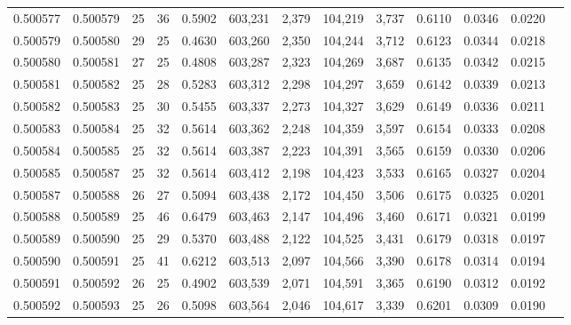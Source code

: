 \begin{tabular}{rrrrrrrrrrrrr}
0.500577 & 0.500579 &    25 &  36 &                                     0.5902 & 603,231 &   2,379 & 104,219 &   3,737 & 0.6110 & 0.0346 & 0.0220 \\
0.500579 & 0.500580 &    29 &  25 &                                     0.4630 & 603,260 &   2,350 & 104,244 &   3,712 & 0.6123 & 0.0344 & 0.0218 \\
0.500580 & 0.500581 &    27 &  25 &                                     0.4808 & 603,287 &   2,323 & 104,269 &   3,687 & 0.6135 & 0.0342 & 0.0215 \\
0.500581 & 0.500582 &    25 &  28 &                                     0.5283 & 603,312 &   2,298 & 104,297 &   3,659 & 0.6142 & 0.0339 & 0.0213 \\
0.500582 & 0.500583 &    25 &  30 &                                     0.5455 & 603,337 &   2,273 & 104,327 &   3,629 & 0.6149 & 0.0336 & 0.0211 \\
0.500583 & 0.500584 &    25 &  32 &                                     0.5614 & 603,362 &   2,248 & 104,359 &   3,597 & 0.6154 & 0.0333 & 0.0208 \\
0.500584 & 0.500585 &    25 &  32 &                                     0.5614 & 603,387 &   2,223 & 104,391 &   3,565 & 0.6159 & 0.0330 & 0.0206 \\
0.500585 & 0.500587 &    25 &  32 &                                     0.5614 & 603,412 &   2,198 & 104,423 &   3,533 & 0.6165 & 0.0327 & 0.0204 \\
0.500587 & 0.500588 &    26 &  27 &                                     0.5094 & 603,438 &   2,172 & 104,450 &   3,506 & 0.6175 & 0.0325 & 0.0201 \\
0.500588 & 0.500589 &    25 &  46 &                                     0.6479 & 603,463 &   2,147 & 104,496 &   3,460 & 0.6171 & 0.0321 & 0.0199 \\
0.500589 & 0.500590 &    25 &  29 &                                     0.5370 & 603,488 &   2,122 & 104,525 &   3,431 & 0.6179 & 0.0318 & 0.0197 \\
0.500590 & 0.500591 &    25 &  41 &                                     0.6212 & 603,513 &   2,097 & 104,566 &   3,390 & 0.6178 & 0.0314 & 0.0194 \\
0.500591 & 0.500592 &    26 &  25 &                                     0.4902 & 603,539 &   2,071 & 104,591 &   3,365 & 0.6190 & 0.0312 & 0.0192 \\
0.500592 & 0.500593 &    25 &  26 &                                     0.5098 & 603,564 &   2,046 & 104,617 &   3,339 & 0.6201 & 0.0309 & 0.0190 \\

\end{tabular}
